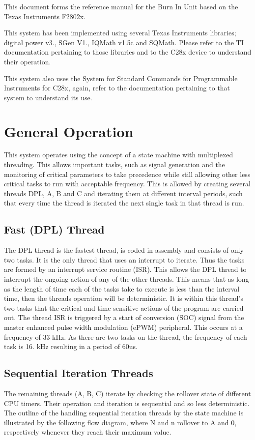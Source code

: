 This document forms the reference manual for the Burn In Unit based on the Texas Instruments F2802x.

This system has been implemented using several Texas Instruments libraries; digital power v3., S\-Gen V1., I\-Q\-Math v1.\-5c and S\-Q\-Math. Please refer to the T\-I documentation pertaining to those libraries and to the C28x device to understand their operation.

This system also uses the System for Standard Commands for Programmable Instruments for C28x, again, refer to the documentation pertaining to that system to understand its use.\hypertarget{index_genop}{}\section{General Operation}\label{index_genop}
This system operates using the concept of a state machine with multiplexed threading. This allows important tasks, such as signal generation and the monitoring of critical parameters to take precedence while still allowing other less critical tasks to run with acceptable frequency. This is allowed by creating several threads D\-P\-L, A, B and C and iterating them at different interval periods, such that every time the thread is iterated the next single task in that thread is run.\hypertarget{index_fdplthread}{}\subsection{Fast (\-D\-P\-L) Thread}\label{index_fdplthread}
The D\-P\-L thread is the fastest thread, is coded in assembly and consists of only two tasks. It is the only thread that uses an interrupt to iterate. Thus the tasks are formed by an interrupt service routine (I\-S\-R). This allows the D\-P\-L thread to interrupt the ongoing action of any of the other threads. This means that as long as the length of time each of the tasks take to execute is less than the interval time, then the threads operation will be deterministic. It is within this thread's two tasks that the critical and time-\/sensitive actions of the program are carried out. The thread I\-S\-R is triggered by a start of conversion (S\-O\-C) signal from the master enhanced pulse width modulation (e\-P\-W\-M) peripheral. This occurs at a frequency of 33 k\-Hz. As there are two tasks on the thread, the frequency of each task is 16. k\-Hz resulting in a period of 60us.\hypertarget{index_sidplthread}{}\subsection{Sequential Iteration Threads}\label{index_sidplthread}
The remaining threads (A, B, C) iterate by checking the rollover state of different C\-P\-U timers. Their operation and iteration is sequential and so less deterministic. The outline of the handling sequential iteration threads by the state machine is illustrated by the following flow diagram, where N and n rollover to A and 0, respectively whenever they reach their maximum value.


